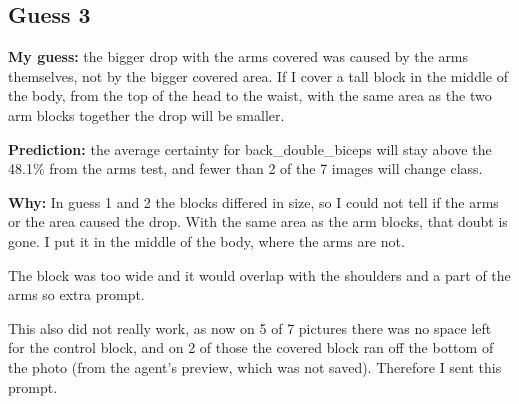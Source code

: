 \documentclass[11pt]{article}
\begin{document}
\subsection*{Guess 3}

\textbf{My guess:} the bigger drop with the arms covered was caused by the arms themselves, not by the bigger covered area. If I cover a tall block in the middle of the body, from the top of the head to the waist, with the same area as the two arm blocks together the drop will be smaller.

\textbf{Prediction:} the average certainty for back\_double\_biceps will stay above the 48.1\% from the arms test, and fewer than 2 of the 7 images will change class.

\textbf{Why:} In guess 1 and 2 the blocks differed in size, so I could not tell if the arms or the area caused the drop. With the same area as the arm blocks, that doubt is gone. I put it in the middle of the body, where the arms are not.

The block was too wide and it would overlap with the shoulders and a part of the arms so extra prompt.

This also did not really work, as now on 5 of 7 pictures there was no space left for the control block, and on 2 of those the covered block ran off the bottom of the photo (from the agent's preview, which was not saved). Therefore I sent this prompt.
\end{document}
